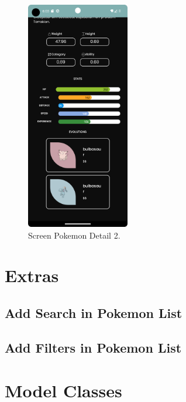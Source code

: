 \documentclass[a4paper, 12pt]{article}
\begin{document}
\begin{figure}
	\centering
	\includegraphics[height=10cm]{imgs/screens/screen_pokemon_detail_2.png}
	\caption{Screen Pokemon Detail 2.}
	\label{fig:screen_pk_detail_2}
\end{figure}


\section{Extras}

\subsection{Add Search in Pokemon List}


\subsection{Add Filters in Pokemon List}






\appendix


\section{Model Classes}
\label{appendix:modelClass}
\end{document}

